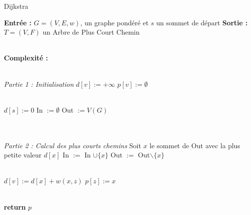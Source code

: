 \documentclass{article}      %
\begin{document}
\begin{algorithm}[H] \caption{Dijkstra}
\begin{algorithmic}

\State \textbf{Entrée :} $G = (V, E, w)$, un graphe pondéré et $s$ un sommet de départ
\State \textbf{Sortie :} $T = (V, F)$ un Arbre de Plus Court Chemin

\\ \State \textbf{Complexité :} %

\\ \State \textit{Partie 1 : Initialisation}
    \State $d[v] := +\infty$
    \State $p[v] := \emptyset$
\EndFor

\\ \State $d[s] := 0$
\State In $:= \emptyset$
\State Out $:= V(G)$

\\\\ \State \textit{Partie 2 : Calcul des plus courts chemins}
    \State Soit $x$ le sommet de Out avec la plus petite valeur $d[x]$
    \State In $:=$ In $\cup \{x\}$
    \State Out $:=$ Out$\backslash \{x\}$
    
    \\ 
            \State $d[v] := d[x] + w(x, z)$
            \State $p[z] := x$
        \EndIf
    \EndFor
\EndWhile

\\ \State \textbf{return} $p$
\end{algorithmic}
\end{algorithm}
\end{document}
